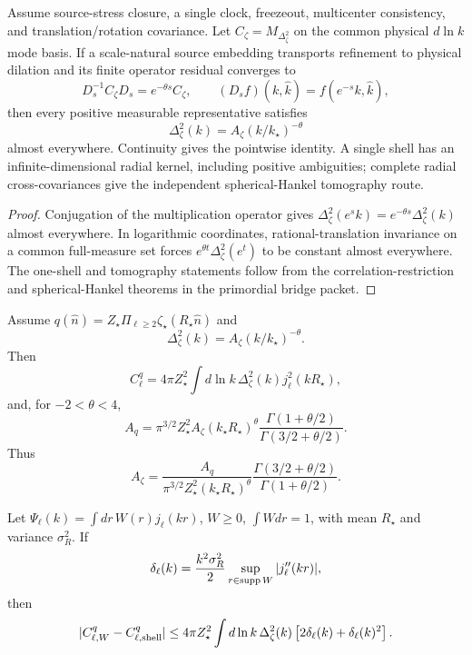 \begin{theorem}\label{thm:oph-screen-radial-source-family}
Assume source-stress closure, a single clock, freezeout, multicenter consistency, and
translation/rotation covariance. Let \(C_\zeta=M_{\Delta_\zeta^2}\) on the common physical
\(d\ln k\) mode basis. If a scale-natural source embedding transports refinement to physical
dilation and its finite operator residual converges to
\[
D_s^{-1}C_\zeta D_s=e^{-\theta s}C_\zeta,
\qquad (D_sf)(k,\hat k)=f(e^{-s}k,\hat k),
\]
then every positive measurable representative satisfies
\[
\Delta_\zeta^2(k)=A_\zeta(k/k_\star)^{-\theta}
\]
almost everywhere. Continuity gives the pointwise identity. A single shell has an
infinite-dimensional radial kernel, including positive ambiguities; complete radial
cross-covariances give the independent spherical-Hankel tomography route.
\end{theorem}

\begin{proof}
Conjugation of the multiplication operator gives
\(\Delta_\zeta^2(e^sk)=e^{-\theta s}\Delta_\zeta^2(k)\) almost everywhere. In logarithmic
coordinates, rational-translation invariance on a common full-measure set forces
\(e^{\theta t}\Delta_\zeta^2(e^t)\) to be constant almost everywhere. The one-shell and
tomography statements follow from the correlation-restriction and spherical-Hankel theorems in
the primordial bridge packet.
\end{proof}

\begin{theorem}\label{thm:oph-thin-shell-powerlaw-lift}
Assume \(q(\hat n)=Z_\star\Pi_{\ell\ge2}\zeta_\star(R_\star\hat n)\) and
\[
  \Delta_\zeta^2(k)=A_\zeta(k/k_\star)^{-\theta}.
\]
Then
\[
  C_\ell^q=4\pi Z_\star^2\int d\ln k\,
  \Delta_\zeta^2(k)j_\ell^2(kR_\star),
\]
and, for \(-2<\theta<4\),
\[
  A_q
  =\pi^{3/2}Z_\star^2A_\zeta(k_\star R_\star)^\theta
  \frac{\Gamma(1+\theta/2)}{\Gamma(3/2+\theta/2)} .
\]
Thus
\[
  A_\zeta
  =\frac{A_q}{\pi^{3/2}Z_\star^2(k_\star R_\star)^\theta}
  \frac{\Gamma(3/2+\theta/2)}{\Gamma(1+\theta/2)} .
\]
\end{theorem}

\begin{proposition}\label{prop:oph-finite-window-bound}
Let \(\Psi_\ell(k)=\int dr\,W(r)j_\ell(kr)\), \(W\ge0\), \(\int Wdr=1\), with mean \(R_\star\)
and variance \(\sigma_R^2\).  If
\[
  \delta_\ell(k)=\frac{k^2\sigma_R^2}{2}
  \sup_{r\in{\rm supp}\,W}|j_\ell''(kr)|,
\]
then
\[
  |C_{\ell,W}^q-C_{\ell,{\rm shell}}^q|
  \le
  4\pi Z_\star^2\int d\ln k\,\Delta_\zeta^2(k)
  \left[2\delta_\ell(k)+\delta_\ell(k)^2\right].
\]
\end{proposition}

